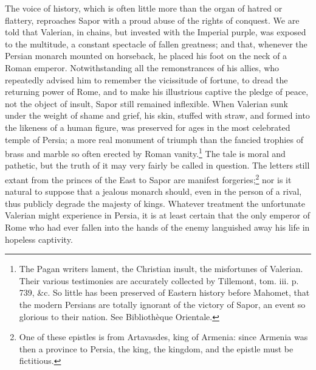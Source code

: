 The voice of history, which is often little more than the organ of hatred or flattery, reproaches Sapor with a proud abuse of the rights of conquest. We are told that Valerian, in chains, but invested with the Imperial purple, was exposed to the multitude, a constant spectacle of fallen greatness; and that, whenever the Persian monarch mounted on horseback, he placed his foot on the neck of a Roman emperor. Notwithstanding all the remonstrances of his allies, who repeatedly advised him to remember the vicissitude of fortune, to dread the returning power of Rome, and to make his illustrious captive the pledge of peace, not the object of insult, Sapor still remained inflexible. When Valerian sunk under the weight of shame and grief, his skin, stuffed with straw, and formed into the likeness of a human figure, was preserved for ages in the most celebrated temple of Persia; a more real monument of triumph than the fancied trophies of brass and marble so often erected by Roman vanity.\footnote{The Pagan writers lament, the Christian insult, the misfortunes of Valerian. Their various testimonies are accurately collected by Tillemont, tom. iii. p. 739, \&c. So little has been preserved of Eastern history before Mahomet, that the modern Persians are totally ignorant of the victory of Sapor, an event so glorious to their nation. See Bibliothèque Orientale.} The tale is moral and pathetic, but the truth of it may very fairly be called in question. The letters still extant from the princes of the East to Sapor are manifest forgeries;\footnote{One of these epistles is from Artavasdes, king of Armenia: since Armenia was then a province to Persia, the king, the kingdom, and the epistle must be fictitious.} nor is it natural to suppose that a jealous monarch should, even in the person of a rival, thus publicly degrade the majesty of kings. Whatever treatment the unfortunate Valerian might experience in Persia, it is at least certain that the only emperor of Rome who had ever fallen into the hands of the enemy languished away his life in hopeless captivity.

